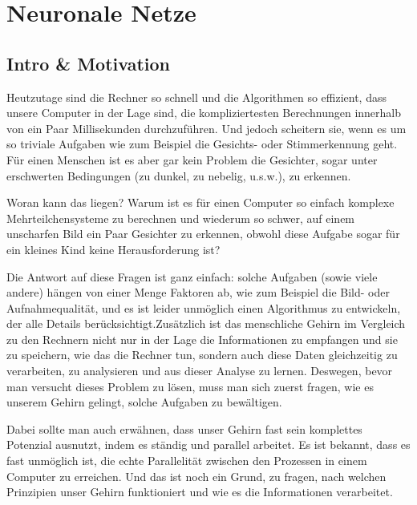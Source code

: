 \usetikzlibrary{calc}
\usetikzlibrary{positioning}
\usetikzlibrary{matrix}


\chapter{Neuronale Netze}
\section{Intro \& Motivation}

Heutzutage sind die Rechner so schnell und die Algorithmen so effizient, dass unsere Computer in der Lage sind, die kompliziertesten Berechnungen innerhalb von ein Paar Millisekunden durchzuführen. Und jedoch scheitern sie, wenn es um so triviale Aufgaben wie zum Beispiel die Gesichts- oder Stimmerkennung  geht. Für einen Menschen ist es aber gar kein Problem die Gesichter, sogar unter erschwerten Bedingungen (zu dunkel, zu nebelig, u.s.w.), zu erkennen.

Woran kann das liegen? Warum ist es für einen Computer so einfach komplexe Mehrteilchensysteme zu berechnen und wiederum so schwer, auf einem unscharfen Bild ein Paar Gesichter zu erkennen, obwohl diese Aufgabe sogar für ein kleines Kind keine Herausforderung ist?

Die Antwort auf diese Fragen ist ganz einfach: solche Aufgaben (sowie viele andere) hängen von einer Menge Faktoren ab, wie zum Beispiel die Bild- oder Aufnahmequalität, und es ist leider unmöglich einen Algorithmus zu entwickeln, der alle Details berücksichtigt.Zusätzlich ist das menschliche Gehirn im Vergleich zu den Rechnern
nicht nur in der Lage die Informationen zu empfangen und sie zu speichern, wie das die Rechner tun, sondern auch diese Daten gleichzeitig zu verarbeiten, zu analysieren und aus dieser Analyse zu lernen. Deswegen, bevor man versucht dieses Problem zu lösen, muss man sich zuerst fragen, wie es unserem Gehirn gelingt, solche Aufgaben zu bewältigen.

Dabei sollte man auch erwähnen, dass unser Gehirn fast sein komplettes Potenzial ausnutzt, indem es ständig und parallel arbeitet. Es ist bekannt, dass es fast unmöglich ist, die echte Parallelität zwischen den Prozessen in einem Computer zu erreichen. Und das ist noch ein Grund, zu fragen, nach welchen Prinzipien unser Gehirn funktioniert und wie es die Informationen verarbeitet.

